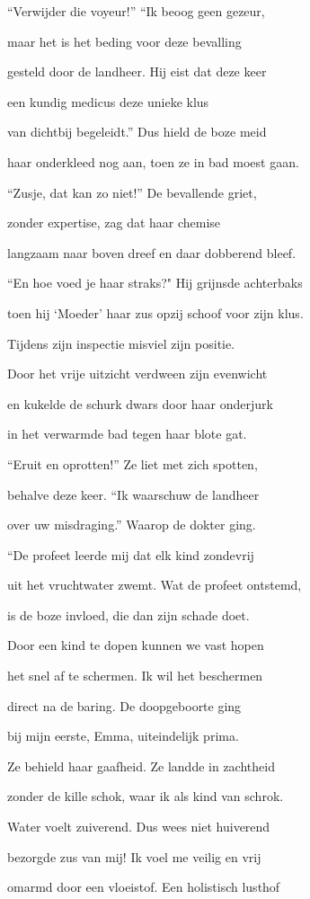“Verwijder die voyeur!”
“Ik beoog geen gezeur,

maar het is het beding
voor deze bevalling

gesteld door de landheer.
Hij eist dat deze keer

een kundig medicus
deze unieke klus

van dichtbij begeleidt.”
Dus hield de boze meid

haar onderkleed nog aan,
toen ze in bad moest gaan.

“Zusje, dat kan zo niet!”
De bevallende griet,

zonder expertise,
zag dat haar chemise

langzaam naar boven dreef
en daar dobberend bleef.

“En hoe voed je haar straks?"
Hij grijnsde achterbaks

toen hij ‘Moeder’ haar zus
opzij schoof voor zijn klus.

Tijdens zijn inspectie
misviel zijn positie.

Door het vrije uitzicht
verdween zijn evenwicht

en kukelde de schurk
dwars door haar onderjurk

in het verwarmde bad
tegen haar blote gat.

“Eruit en oprotten!”
Ze liet met zich spotten,

behalve deze keer.
“Ik waarschuw de landheer

over uw misdraging.”
Waarop de dokter ging.

“De profeet leerde mij
dat elk kind zondevrij

uit het vruchtwater zwemt.
Wat de profeet ontstemd,

is de boze invloed,
die dan zijn schade doet.

Door een kind te dopen
kunnen we vast hopen

het snel af te schermen.
Ik wil het beschermen

direct na de baring.
De doopgeboorte ging

bij mijn eerste, Emma,
uiteindelijk prima.

Ze behield haar gaafheid.
Ze landde in zachtheid

zonder de kille schok,
waar ik als kind van schrok.

Water voelt zuiverend.
Dus wees niet huiverend

bezorgde zus van mij!
Ik voel me veilig en vrij

omarmd door een vloeistof.
Een holistisch lusthof

